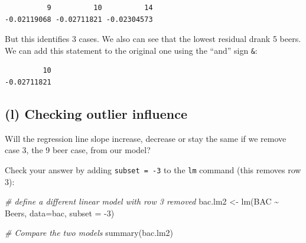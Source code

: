 \documentclass[
]{book}
\newenvironment{Shaded}{\begin{snugshade}}{\end{snugshade}}
\newcommand{\AttributeTok}[1]{\textcolor[rgb]{0.77,0.63,0.00}{#1}}
\newcommand{\CommentTok}[1]{\textcolor[rgb]{0.56,0.35,0.01}{\textit{#1}}}
\newcommand{\DecValTok}[1]{\textcolor[rgb]{0.00,0.00,0.81}{#1}}
\newcommand{\FloatTok}[1]{\textcolor[rgb]{0.00,0.00,0.81}{#1}}
\newcommand{\FunctionTok}[1]{\textcolor[rgb]{0.00,0.00,0.00}{#1}}
\newcommand{\NormalTok}[1]{#1}
\newcommand{\OtherTok}[1]{\textcolor[rgb]{0.56,0.35,0.01}{#1}}
\newcommand{\SpecialCharTok}[1]{\textcolor[rgb]{0.00,0.00,0.00}{#1}}
\begin{document}
\begin{verbatim}
          9          10          14 
-0.02119068 -0.02711821 -0.02304573 
\end{verbatim}

But this identifies 3 cases. We also can see that the lowest residual drank 5 beers. We can add this statement to the original one using the ``and'' sign \texttt{\&}:

\begin{Shaded}
\end{Shaded}

\begin{verbatim}
         10 
-0.02711821 
\end{verbatim}

\hypertarget{l-checking-outlier-influence}{%
\subsection{(l) Checking outlier influence}\label{l-checking-outlier-influence}}

Will the regression line slope increase, decrease or stay the same if we remove case 3, the 9 beer case, from our model?

Check your answer by adding \texttt{subset\ =\ -3} to the \texttt{lm} command (this removes row 3):

\begin{Shaded}
\begin{Highlighting}[]
\CommentTok{\# define a different linear model with row 3 removed }
\NormalTok{bac.lm2 }\OtherTok{\textless{}{-}} \FunctionTok{lm}\NormalTok{(BAC }\SpecialCharTok{\textasciitilde{}}\NormalTok{ Beers, }\AttributeTok{data=}\NormalTok{bac, }\AttributeTok{subset =} \SpecialCharTok{{-}}\DecValTok{3}\NormalTok{)}
\end{Highlighting}
\end{Shaded}

\begin{Shaded}
\begin{Highlighting}[]
\CommentTok{\# Compare the two models}
\FunctionTok{summary}\NormalTok{(bac.lm2)}
\end{Highlighting}
\end{Shaded}
\end{document}
